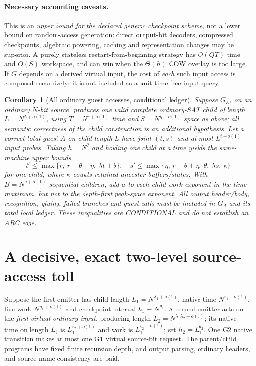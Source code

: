 \documentclass[11pt]{article}
\newtheorem{corollary}[theorem]{Corollary}
\begin{document}
\paragraph{Necessary accounting caveats.}
This is an \emph{upper bound for the declared generic checkpoint scheme},
not a lower bound on random-access generation: direct output-bit
decoders, compressed checkpoints, algebraic powering, caching and
representation changes may be superior. A purely stateless
restart-from-beginning strategy has $O(QT)$ time and
$O(S)$ workspace, and can win when the $\Theta(h)$ COW overlay is too
large. If $G$ depends on a derived virtual input, the cost of \emph{each}
such input access is composed recursively; it is not included as a
unit-time free input query.

\begin{corollary}[All ordinary guest accesses, conditional ledger]
Suppose $G_A$, on an ordinary $N$-bit source, produces one \emph{valid
complete ordinary-SAT child} of length $L=N^{\lambda+o(1)}$,
using $T=N^{r+o(1)}$ time and
$S=N^{\eta+o(1)}$ space as above; all semantic correctness of the
child construction is an \emph{additional} hypothesis.
Let a correct total guest $A$ on child length $L$ have joint
$(t,s)$ and at most $L^{t+o(1)}$ input probes.
Taking $h=N^\theta$ and holding one child at a time yields the
\emph{same-machine} upper bounds
\[
\boxed{
t'\le\max\{r,\ r-\theta+\eta,\ \lambda t+\theta\},\quad
s'\le\max\{\eta,\ r-\theta+\eta,\ \theta,\ \lambda s,\ \kappa\}
}
\tag{3}
\]
for one child, where $\kappa$ counts retained ancestor buffers/states.
With $B=N^{a+o(1)}$ sequential children, add $a$ to each child-work
exponent in the time maximum, but \emph{not} to the depth-first peak-space
exponent. All output header/body, recognition, gluing, failed branches
and guest calls must be included in $G_A$ and its total local ledger.
These inequalities are CONDITIONAL and do not establish an ARC edge.
\]
\end{corollary}

\section{A decisive, exact two-level source-access toll}
Suppose the first emitter has child length $L_1=N^{\lambda_1+o(1)}$,
native time $N^{r_1+o(1)}$, live work $N^{\eta_1+o(1)}$
and checkpoint interval $h_1=N^{\theta_1}$.
A second emitter acts on the \emph{first virtual ordinary input},
producing length $L_2=N^{\lambda_1\lambda_2+o(1)}$;
its native time on length $L_1$ is
$L_1^{r_2+o(1)}$ and work is $L_1^{\eta_2+o(1)}$;
set $h_2=L_1^{\theta_2}$.
One G2 native transition makes at most one G1 virtual source-bit request.
The parent/child programs have fixed finite recursion depth, and
output parsing, ordinary headers, and source-name consistency are paid.
\end{document}
